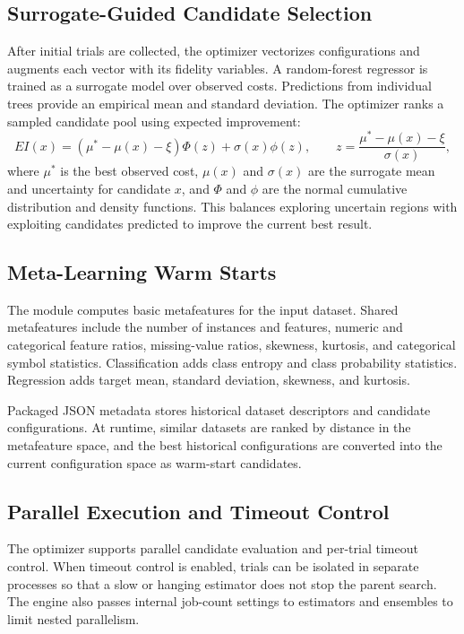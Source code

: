 \documentclass[12pt,a4paper]{report}
\begin{document}
\subsection{Surrogate-Guided Candidate Selection}
After initial trials are collected, the optimizer vectorizes configurations and
augments each vector with its fidelity variables. A random-forest regressor is
trained as a surrogate model over observed costs. Predictions from individual
trees provide an empirical mean and standard deviation. The optimizer ranks a
sampled candidate pool using expected improvement:
\[
  EI(x) =
  (\mu^* - \mu(x) - \xi)\Phi(z) + \sigma(x)\phi(z),
  \qquad
  z = \frac{\mu^* - \mu(x) - \xi}{\sigma(x)} ,
\]
where $\mu^*$ is the best observed cost, $\mu(x)$ and $\sigma(x)$ are the
surrogate mean and uncertainty for candidate $x$, and $\Phi$ and $\phi$ are the
normal cumulative distribution and density functions. This balances exploring
uncertain regions with exploiting candidates predicted to improve the current
best result.

\subsection{Meta-Learning Warm Starts}
The module computes basic metafeatures for the input dataset. Shared
metafeatures include the number of instances and features, numeric and
categorical feature ratios, missing-value ratios, skewness, kurtosis, and
categorical symbol statistics. Classification adds class entropy and class
probability statistics. Regression adds target mean, standard deviation,
skewness, and kurtosis.

Packaged JSON metadata stores historical dataset descriptors and candidate
configurations. At runtime, similar datasets are ranked by distance in the
metafeature space, and the best historical configurations are converted into
the current configuration space as warm-start candidates.

\subsection{Parallel Execution and Timeout Control}
The optimizer supports parallel candidate evaluation and per-trial timeout
control. When timeout control is enabled, trials can be isolated in separate
processes so that a slow or hanging estimator does not stop the parent search.
The engine also passes internal job-count settings to estimators and ensembles
to limit nested parallelism.
\end{document}
